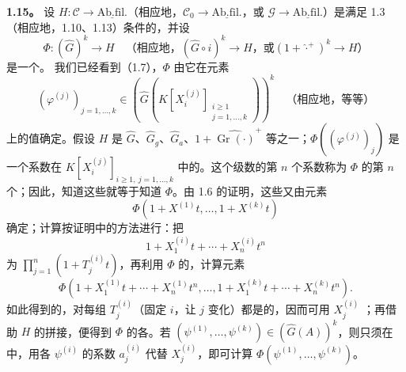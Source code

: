 \textbf{1.15。} 设 $H:\mathscr C\longrightarrow\underline{\mathrm{Ab.fil.}}$（相应地，$\mathscr C_0\longrightarrow\underline{\mathrm{Ab.fil.}}$，或 $\mathscr G\longrightarrow\underline{\mathrm{Ab.fil.}}$）是满足 1.3（相应地，1.10、1.13）条件的，并设
\[
\Phi:(\widehat G)^k\longrightarrow H
\quad\text{（相应地，$(\widehat G\circ i)^k\longrightarrow H$，或
$(1+\widehat{\cdot}^{+})^k\longrightarrow H$）}
\]
是一个。
我们已经看到（1.7），$\Phi$ 由它在元素
\[
(\varphi^{(j)})_{j=1,\ldots,k}\in
\left(\widehat G\left(K[X_i^{(j)}]_{\substack{i\geqslant1\\j=1,\ldots,k}}\right)\right)^k
\quad\text{（相应地，等等）}
\]
上的值确定。假设 $H$ 是 $\widehat G$、$\widehat G_g$、$\widehat G_a$、$1+\widehat{\operatorname{Gr}(\cdot)}^{+}$ 等之一；$\Phi((\varphi^{(j)})_j)$ 是一个系数在 $K[X_i^{(j)}]_{i\geqslant1,\ j=1,\ldots,k}$ 中的。这个级数的第 $n$ 个系数称为 $\Phi$ 的第 $n$ 个；因此，知道这些就等于知道 $\Phi$。由 1.6 的证明，这些又由元素
\[
\Phi(1+X^{(1)}t,\ldots,1+X^{(k)}t)
\]
确定；计算按证明中的方法进行：把
\[
1+X_1^{(i)}t+\cdots+X_n^{(i)}t^n
\]
为 $\prod_{j=1}^n(1+T_j^{(i)}t)$，再利用 $\Phi$ 的，计算元素
\[
\Phi(1+X_1^{(1)}t+\cdots+X_n^{(1)}t^n,\ldots,
1+X_1^{(k)}t+\cdots+X_n^{(k)}t^n).
\]
如此得到的，对每组 $T_j^{(i)}$（固定 $i$，让 $j$ 变化）都是的，因而可用 $X_j^{(i)}$ ；再借助 $H$ 的拼接，便得到 $\Phi$ 的各。若 $(\psi^{(1)},\ldots,\psi^{(k)})\in(\widehat G(A))^k$，则只须在中，用各 $\psi^{(i)}$ 的系数 $a_j^{(i)}$ 代替 $X_j^{(i)}$，即可计算 $\Phi(\psi^{(1)},\ldots,\psi^{(k)})$。

